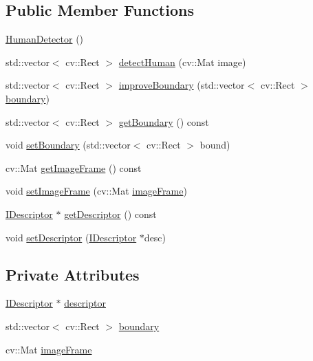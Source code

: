 \subsection*{Public Member Functions}
\begin{DoxyCompactItemize}
\item 
\hyperlink{classHumanDetector_a8910bbd14716e8e47a4f3d33daeb5eba}{Human\+Detector} ()
\item 
std\+::vector$<$ cv\+::\+Rect $>$ \hyperlink{classHumanDetector_ac3c3f22f9c79dc927085f9d0bea7aeac}{detect\+Human} (cv\+::\+Mat image)
\item 
std\+::vector$<$ cv\+::\+Rect $>$ \hyperlink{classHumanDetector_aa8923db715d106cfbe4ef5f4aadc87d0}{improve\+Boundary} (std\+::vector$<$ cv\+::\+Rect $>$ \hyperlink{classHumanDetector_acbdcb52dde539827a65d86829cc90ce3}{boundary})
\item 
std\+::vector$<$ cv\+::\+Rect $>$ \hyperlink{classHumanDetector_ae5ab3f70b303e82a52b779eaedcf7709}{get\+Boundary} () const 
\item 
void \hyperlink{classHumanDetector_a02a790efcb7f2619b6ccff2195b0a95a}{set\+Boundary} (std\+::vector$<$ cv\+::\+Rect $>$ bound)
\item 
cv\+::\+Mat \hyperlink{classHumanDetector_a0faff34f61f2c60e41f8b355de2b7700}{get\+Image\+Frame} () const 
\item 
void \hyperlink{classHumanDetector_ab20928eff64db213e7e43b4a41ba6b5e}{set\+Image\+Frame} (cv\+::\+Mat \hyperlink{classHumanDetector_a5a075756a9b9ff4f0fa9fcd5fbe757b8}{image\+Frame})
\item 
\hyperlink{classIDescriptor}{I\+Descriptor} $\ast$ \hyperlink{classHumanDetector_acadd0401a44143430c329ab9393027c8}{get\+Descriptor} () const 
\item 
void \hyperlink{classHumanDetector_a2e3d5a1f08d525599b706a76926f65d5}{set\+Descriptor} (\hyperlink{classIDescriptor}{I\+Descriptor} $\ast$desc)
\end{DoxyCompactItemize}
\subsection*{Private Attributes}
\begin{DoxyCompactItemize}
\item 
\hyperlink{classIDescriptor}{I\+Descriptor} $\ast$ \hyperlink{classHumanDetector_a920f67ab988786133b5fd478a0711965}{descriptor}
\item 
std\+::vector$<$ cv\+::\+Rect $>$ \hyperlink{classHumanDetector_acbdcb52dde539827a65d86829cc90ce3}{boundary}
\item 
cv\+::\+Mat \hyperlink{classHumanDetector_a5a075756a9b9ff4f0fa9fcd5fbe757b8}{image\+Frame}
\end{DoxyCompactItemize}


